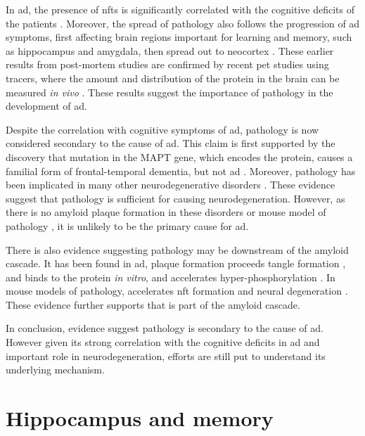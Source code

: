 In \gls{ad}, the presence of \glspl{nft} is significantly correlated with the cognitive deficits of the patients \citep{hyman12}. Moreover, the spread of \atau{} pathology also follows the progression of \gls{ad} symptoms, first affecting brain regions important for learning and memory, such as hippocampus and amygdala, then spread out to neocortex \citep{braak91}. These earlier results from post-mortem studies are confirmed by recent \gls{pet} studies using \atau{} tracers, where the amount and distribution of the \atau{} protein in the brain can be measured \textit{in vivo} \citep{ossenkoppele16, scholl16}. These results suggest the importance of \atau{} pathology in the development of \gls{ad}.

Despite the correlation with cognitive symptoms of \gls{ad}, \atau{} pathology is now considered secondary to the cause of \gls{ad}. This claim is first supported by the discovery that mutation in the MAPT gene, which encodes the \atau{} protein, causes a familial form of frontal-temporal dementia, but not \gls{ad} \citep{hutton98, poorkaj98}. Moreover, \atau{} pathology has been implicated in many other neurodegenerative disorders \citep[e.g.][]{williams09, mckee16}. These evidence suggest that \atau{} pathology is sufficient for causing neurodegeneration. However, as there is no amyloid plaque formation in these disorders or mouse model of \atau{} pathology \citep{gotz04}, it is unlikely to be the primary cause for \gls{ad}.

There is also evidence suggesting \atau{} pathology may be downstream of the amyloid cascade. It has been found in \gls{ad}, plaque formation proceeds tangle formation \citep{price99}, and \abeta{} binds to the \atau{} protein \textit{in vitro}, and accelerates \atau{} hyper-phosphorylation \citep{guo06, zempel10}. In mouse models of \atau{} pathology, \abeta{} accelerates \gls{nft} formation and neural degeneration \citep{lewis01, terwel08}. These evidence further supports that \atau{} is part of the amyloid cascade. 

In conclusion, evidence suggest \atau{} pathology is secondary to the cause of \gls{ad}. However given its strong correlation with the cognitive deficits in \gls{ad} and important role in neurodegeneration, efforts are still put to understand its underlying mechanism. 

\section{Hippocampus and memory}
